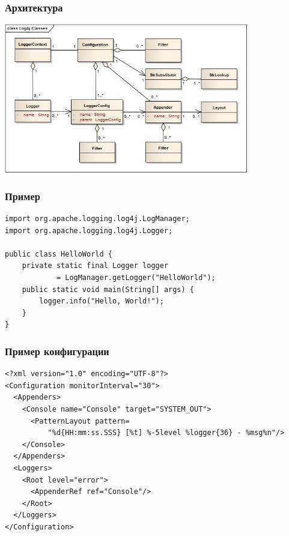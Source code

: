 \documentclass[xetex,mathserif,serif]{beamer}
\begin{document}
	\begin{frame}
		\frametitle{Архитектура}
		\begin{center}
			\includegraphics[width=0.8\textwidth]{log4jClasses.jpg}
		\end{center}
	\end{frame}

	\begin{frame}[fragile]
		\frametitle{Пример}
		\begin{verbatim}
import org.apache.logging.log4j.LogManager;
import org.apache.logging.log4j.Logger;
 
public class HelloWorld {
    private static final Logger logger 
            = LogManager.getLogger("HelloWorld");
    public static void main(String[] args) {
        logger.info("Hello, World!");
    }
}
		\end{verbatim}
\end{frame}

	\begin{frame}[fragile]
		\frametitle{Пример конфигурации}
		\begin{verbatim}
<?xml version="1.0" encoding="UTF-8"?>
<Configuration monitorInterval="30">
  <Appenders>
    <Console name="Console" target="SYSTEM_OUT">
      <PatternLayout pattern=
          "%d{HH:mm:ss.SSS} [%t] %-5level %logger{36} - %msg%n"/>
    </Console>
  </Appenders>
  <Loggers>
    <Root level="error">
      <AppenderRef ref="Console"/>
    </Root>
  </Loggers>
</Configuration>
		\end{verbatim}
\end{frame}
\end{document}

